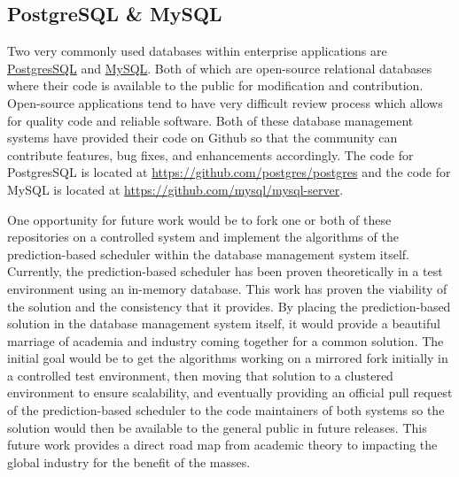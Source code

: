 \subsection{PostgreSQL \& MySQL}
\label{conclusion:posgressql}
Two very commonly used databases within enterprise applications are \href{https://www.postgresql.org/}{PostgresSQL} and \href{https://www.mysql.com/}{MySQL}. Both of which are open-source relational databases where their code is available to the public for modification and contribution. Open-source applications tend to have very difficult review process which allows for quality code and reliable software. Both of these database management systems have provided their code on Github so that the community can contribute features, bug fixes, and enhancements accordingly. The code for PostgresSQL is located at \href{https://github.com/postgres/postgres}{https://github.com/postgres/postgres} and the code for MySQL is located at \href{https://github.com/mysql/mysql-server}{https://github.com/mysql/mysql-server}.

One opportunity for future work would be to fork one or both of these repositories on a controlled system and implement the algorithms of the prediction-based scheduler within the database management system itself. Currently, the prediction-based scheduler has been proven theoretically in a test environment using an in-memory database. This work has proven the viability of the solution and the consistency that it provides. By placing the prediction-based solution in the database management system itself, it would provide a beautiful marriage of academia and industry coming together for a common solution. The initial goal would be to get the algorithms working on a mirrored fork initially in a controlled test environment, then moving that solution to a clustered environment to ensure scalability, and eventually providing an official pull request of the prediction-based scheduler to the code maintainers of both systems so the solution would then be available to the general public in future releases. This future work provides a direct road map from academic theory to impacting the global industry for the benefit of the masses.